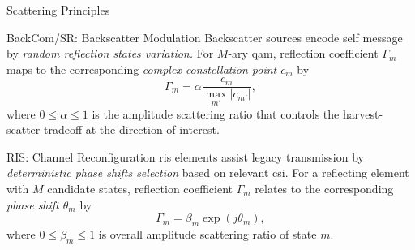 \documentclass[journal]{IEEEtran}
\begin{document}
\begin{section}{Scattering Principles}
	\begin{subsection}{BackCom/SR: Backscatter Modulation}
		Backscatter sources encode self message by \emph{random reflection states variation.} For $M$-ary \gls{qam}, reflection coefficient $\Gamma_m$ maps to the corresponding \emph{complex constellation point $c_m$} by \cite{Thomas2012a}
		\begin{equation}
			\Gamma_m = \alpha \frac{c_m}{\max_{m'} \lvert c_{m'} \rvert},
			\label{eq:backscatter_modulation}
		\end{equation}
		where $0 \le \alpha \le 1$ is the amplitude scattering ratio that controls the harvest-scatter tradeoff at the direction of interest.

	\end{subsection}

	\begin{subsection}{RIS: Channel Reconfiguration}
		\gls{ris} elements assist legacy transmission by \emph{deterministic phase shifts selection} based on relevant \gls{csi}.
		For a reflecting element with $M$ candidate states, reflection coefficient $\Gamma_m$ relates to the corresponding \emph{phase shift $\theta_m$} by \cite{Wu2018}
		\begin{equation}
			\Gamma_m = \beta_m \exp(j \theta_m),
		\end{equation}
		where $0 \le \beta_m \le 1$ is overall amplitude scattering ratio of state $m$.
	\end{subsection}


\end{section}
\end{document}
